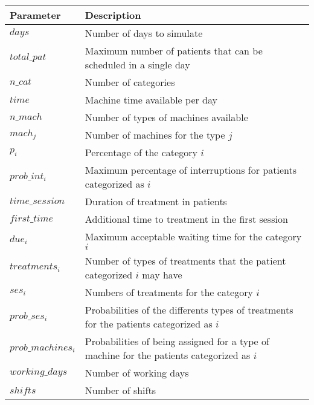 \begin{tabular}{lp{10cm}}
\hline
 Parameter & Description\\
 \hline
 $days$ & Number of days to simulate\\
 $total\_pat$ & Maximum number of patients that can be scheduled in a single day\\
 $n\_cat$ & Number of categories\\
 $time$ & Machine time available per day\\
 $n\_mach$ & Number of types of machines available\\
 $mach_j$ & Number of machines for the type $j$\\
 $p_{i}$ & Percentage of the category $i$\\
 $prob\_int_i$ & Maximum percentage of interruptions for patients categorized as $i$\\
 $time\_session$ & Duration of treatment in patients\\
 $first\_time$ & Additional time to treatment in the first session\\
 $due_i$ & Maximum acceptable waiting time for the category $i$\\
 $treatments_i$ & Number of types of treatments that the patient categorized $i$ may have\\
 $ses_i$ & Numbers of treatments for the category $i$\\
 $prob\_ses_i$ & Probabilities of the differents types of treatments for the patients categorized as $i$\\
 $prob\_machines_i$ & Probabilities of being assigned for a type of machine for the patients categorized as $i$\\
 $working\_days$ & Number of working days\\
 $shifts$ & Number of shifts\\
\end{tabular}